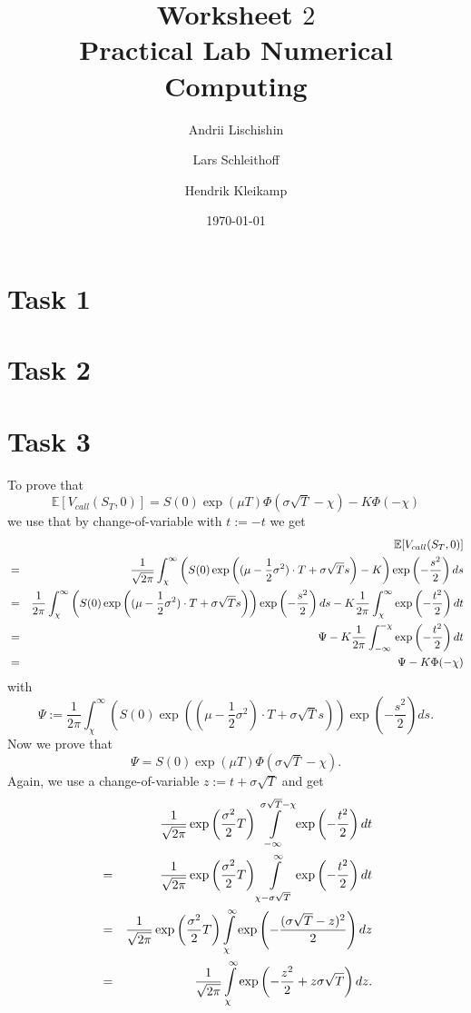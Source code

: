 \documentclass[10pt,a4paper]{article}
\begin{document}
\title{Worksheet $2$\\
\small{Practical Lab Numerical Computing}}
\author{Andrii Lischishin \and Lars Schleithoff \and Hendrik Kleikamp}
\date{\today}
\maketitle

\section*{Task 1}

\section*{Task 2}

\section*{Task 3}
To prove that
\[
\mathbb{E}[V_{call}(S_T,0)]=S(0)\exp(\mu T)\Phi(\sigma\sqrt{T}-\chi)-K\Phi(-\chi)
\]
we use that by change-of-variable with $t:=-t$ we get
\begin{eqnarray}
&&\mathbb{E}[V_{call}(S_T,0)] \notag\\
&=&\frac{1}{\sqrt{2\pi}}\int_{\chi}^{\infty}\left(S(0)\exp\left((\mu-\frac{1}{2}\sigma^2)\cdot T+\sigma\sqrt{T}s\right)-K\right)\exp\left(-\frac{s^2}{2}\right)ds \notag\\
&=&\frac{1}{2\pi}\int_{\chi}^{\infty}\left(S(0)\exp\left((\mu-\frac{1}{2}\sigma^2)\cdot T+\sigma\sqrt{T}s\right)\right)\exp\left(-\frac{s^2}{2}\right)ds-K\frac{1}{2\pi}\int_{\chi}^{\infty}\exp\left(-\frac{t^2}{2}\right)dt \notag\\
&=&\Psi-K\frac{1}{2\pi}\int_{-\infty}^{-\chi}\exp\left(-\frac{t^2}{2}\right)dt \notag\\
&=&\Psi-K\Phi(-\chi) \notag
\end{eqnarray}
with
\[
\Psi:=\frac{1}{2\pi}\int_{\chi}^{\infty}\left(S(0)\exp\left((\mu-\frac{1}{2}\sigma^2)\cdot T+\sigma\sqrt{T}s\right)\right)\exp\left(-\frac{s^2}{2}\right)ds.
\]
Now we prove that
\[
\Psi=S(0)\exp(\mu T)\Phi(\sigma\sqrt{T}-\chi).
\]
Again, we use a change-of-variable $z:=t+\sigma\sqrt{T}$ and get
\begin{eqnarray}
&&\frac{1}{\sqrt{2\pi}}\exp\left(\frac{\sigma^2}{2}T\right)\int\limits_{-\infty}^{\sigma\sqrt{T}-\chi}\exp\left(-\frac{t^2}{2}\right)dt \notag\\
&=&\frac{1}{\sqrt{2\pi}}\exp\left(\frac{\sigma^2}{2}T\right)\int\limits_{\chi-\sigma\sqrt{T}}^{\infty}\exp\left(-\frac{t^2}{2}\right)dt \notag\\
&=&\frac{1}{\sqrt{2\pi}}\exp\left(\frac{\sigma^2}{2}T\right)\int\limits_{\chi}^{\infty}\exp\left(-\frac{(\sigma\sqrt{T}-z)^2}{2}\right)dz \notag\\
&=&\frac{1}{\sqrt{2\pi}}\int\limits_{\chi}^{\infty}\exp\left(-\frac{z^2}{2}+z\sigma\sqrt{T}\right)dz. \notag
\end{eqnarray}
\end{document}
